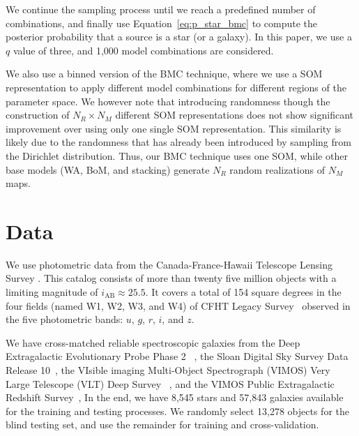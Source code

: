 \documentclass[useAMS,usenatbib]{mn2e}
\begin{document}
We continue the sampling process until
we reach a predefined number of combinations,
and finally use Equation~\ref{eq:p_star_bmc} to compute
the posterior probability that a source is a star (or a galaxy).
In this paper, we use a $q$ value of three,
and 1,000 model combinations are considered.


We also use a binned version of the BMC technique,
where we use a SOM representation
to apply different model combinations
for different regions of the parameter space.
We however note that introducing randomness
though the construction of $N_R \times N_M$ different SOM representations
does not show significant
improvement over using only one single SOM representation.
This similarity is likely due to the randomness 
that has already been introduced by 
sampling from the Dirichlet distribution.
Thus, our BMC technique uses one SOM,
while other base models (WA, BoM, and stacking)
generate $N_R$ random realizations of $N_M$ maps.


\section{Data}
  \label{section:data}

We use photometric data from
the Canada-France-Hawaii Telescope Lensing Survey
\cite[CFHTLenS\footnote{http://www.cfhtlens.org/};][]
{heymans2012cfhtlens,erben2013cfhtlens,hildebrandt2012cfhtlens}.
This catalog consists of more than twenty five million objects
with a limiting magnitude of $i_{\text{AB}} \approx 25.5$. 
It covers a total of 154 square degrees
in the four fields (named W1, W2, W3, and W4)
of CFHT Legacy Survey~\citep[CFHTLS;][]{gwyn2012canada}
observed in the five photometric bands:
$u$, $g$, $r$, $i$, and $z$.

We have cross-matched reliable spectroscopic galaxies from
the Deep Extragalactic Evolutionary Probe Phase 2~
\citep[DEEP2;][]{davis2003science,newman2013deep2},
the Sloan Digital Sky Survey Data Release 10~\citep[SDSS-DR10]{Ahn2014},
the VIsible imaging Multi-Object Spectrograph (VIMOS)
Very Large Telescope (VLT) Deep Survey~
\citep[VVDS;][]{le2005vimos,garilli2008vimos}, and
the VIMOS Public Extragalactic Redshift
Survey~\citep[VIPERS;][]{garilli2014vimos},
In the end, we have 8,545 stars and 57,843 galaxies available
for the training and testing processes.
We randomly select 13,278 objects for the blind testing set,
and use the remainder for training and cross-validation.
\end{document}
